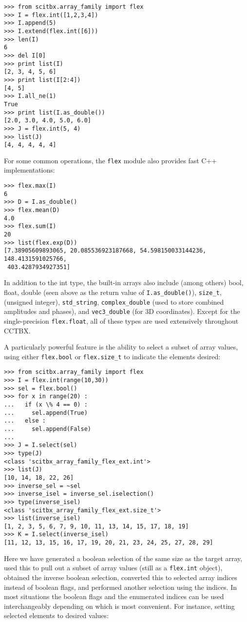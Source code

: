 \documentclass{article}
\begin{document}
\begin{Verbatim}
>>> from scitbx.array_family import flex
>>> I = flex.int([1,2,3,4])
>>> I.append(5)
>>> I.extend(flex.int([6]))
>>> len(I)
6
>>> del I[0]
>>> print list(I)
[2, 3, 4, 5, 6]
>>> print list(I[2:4])
[4, 5]
>>> I.all_ne(1)
True
>>> print list(I.as_double())
[2.0, 3.0, 4.0, 5.0, 6.0]
>>> J = flex.int(5, 4)
>>> list(J)
[4, 4, 4, 4, 4]
\end{Verbatim}


For some common operations, the {\tt flex} module also provides fast C++
implementations:


\begin{Verbatim}
>>> flex.max(I)
6
>>> D = I.as_double()
>>> flex.mean(D)
4.0
>>> flex.sum(I)
20
>>> list(flex.exp(D))
[7.38905609893065, 20.085536923187668, 54.598150033144236, 148.4131591025766,
 403.4287934927351]
\end{Verbatim}

In addition to the int type, the built-in arrays also include (among others)
bool, float, double (seen above as the return value of {\tt I.as\_double()}),
{\tt size\_t}, (unsigned integer), {\tt std\_string}, {\tt complex\_double}
(used to store combined amplitudes and phases), and {\tt vec3\_double} (for
3D coordinates).  Except for the
single-precision {\tt flex.float}, all of these types are used extensively
throughout CCTBX.


A particularly powerful feature is the ability to select a subset of array
values, using either {\tt flex.bool} or {\tt flex.size\_t} to indicate the
elements desired:


\begin{Verbatim}
>>> from scitbx.array_family import flex
>>> I = flex.int(range(10,30))
>>> sel = flex.bool()
>>> for x in range(20) :
...   if (x \% 4 == 0) :
...     sel.append(True)
...   else :
...     sel.append(False)
... 
>>> J = I.select(sel)
>>> type(J)
<class 'scitbx_array_family_flex_ext.int'>
>>> list(J)
[10, 14, 18, 22, 26]
>>> inverse_sel = ~sel
>>> inverse_isel = inverse_sel.iselection()
>>> type(inverse_isel)
<class 'scitbx_array_family_flex_ext.size_t'>
>>> list(inverse_isel)
[1, 2, 3, 5, 6, 7, 9, 10, 11, 13, 14, 15, 17, 18, 19]
>>> K = I.select(inverse_isel)
[11, 12, 13, 15, 16, 17, 19, 20, 21, 23, 24, 25, 27, 28, 29]
\end{Verbatim}


Here we have generated a boolean selection of the same size as the target
array, used this to pull out a subset of array values (still as a
{\tt flex.int}
object), obtained the inverse boolean selection, converted this to selected
array indices instead of boolean flags, and performed another selection using
the indices.  In most situations the boolean flags and the enumerated indices
can be used interchangeably depending on which is most convenient.  For
instance, setting selected elements to desired values:
\end{document}
